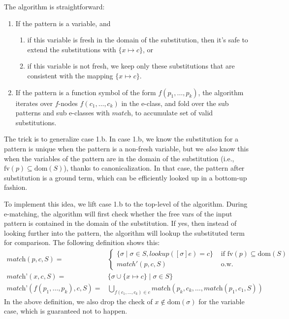 The algorithm is straightforward:
\begin{enumerate}
\tightlist
\item
  If the pattern is a variable, and
  \begin{enumerate}
  \tightlist
  \item
    if this variable is fresh in the domain of the substitution, then
    it's safe to extend the substitutions with \(\{x\mapsto c\}\), or
  \item
    if this variable is not fresh, we keep only these substitutions that
    are consistent with the mapping \(\{x\mapsto c\}\).
  \end{enumerate}
\item
  If the pattern is a function symbol of the form \(f(p_1,\ldots,p_k)\),
  the algorithm iterates over \(f\)-nodes \(f(c_1,\ldots, c_k)\) in the
  e-class, and fold over the sub patterns and sub e-classes with
  \(\textit{match}\), to accumulate set of valid substitutions.
\end{enumerate}

The trick is to generalize case 1.b.
In case 1.b, we know the
 substitution for a pattern is unique when the pattern is a non-fresh
 variable, but we \emph{also} know this when the variables of the pattern
 are in the domain of the substitution (i.e.,
 \(\text{fv}(p)\subseteq\text{dom}(S)\)), thanks to canonicalization.
In that case, 
 the pattern after substitution is a ground term, 
 which can be efficiently looked up in a bottom-up fashion.

To implement this idea, we lift case 1.b to the top-level of the
 algorithm.
During e-matching, 
 the algorithm will first check whether the
 free vars of the input pattern is contained in the domain of the
 substitution.
If yes, 
 then instead of looking further into the pattern,
 the algorithm will lookup the substituted term for comparison.
The following definition shows this:
\begin{align*}
    \textit{match}(p, c, S) = & \begin{cases}
        \{\sigma \mid \sigma\in S, 
                      \textit{lookup}([\sigma]e)=c\} 
        &\text{ if $\text{fv}(p)\subseteq \text{dom}(S)$ }\\
        match'(p, c, S)&\text{ o.w.}
    \end{cases}\\
    \textit{match'}(x,c,S) = 
                   & \{ \sigma \cup \{ x \mapsto c\} \mid \sigma \in S\}\\
    \textit{match'}(f(p_{1}, \dots, p_{k}), c, S) = 
                   & \bigcup_{f(c_{1},\dots,c_{k})\in c}
                     \textit{match}(p_{k}, c_{k}, \dots, \textit{match}(p_{1}, c_{1}, S))
\end{align*}
In the above definition, we also drop the check of
\(x\not\in\text{dom}(\sigma)\) for the variable case, which is
guaranteed not to happen.

